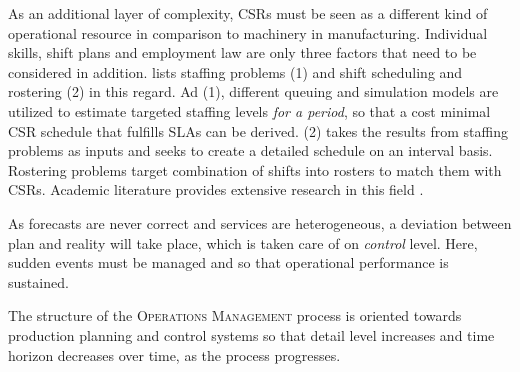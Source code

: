 	As an additional layer of complexity, \acrshort{CSR}s must be seen as a different kind of operational resource in comparison to machinery in manufacturing. Individual skills, shift plans and employment law are only three factors that need to be considered in addition. \cite{Aksin_2009} lists staffing problems (1) and shift scheduling and rostering (2) in this regard. Ad (1), different queuing and simulation models are utilized to estimate targeted staffing levels \textit{for a period}, so that a cost minimal \acrshort{CSR} schedule that fulfills \acrshort{SLA}s can be derived. 
	(2) takes the results from staffing problems as inputs and seeks to create a detailed schedule on an interval basis. Rostering problems target combination of shifts into rosters to match them with \acrshort{CSR}s. Academic literature provides extensive research in this field \citep{Gans_2003, Ernst_2004}. 
	
	As forecasts are never correct and services are heterogeneous, a deviation between plan and reality will take place, which is taken care of on \textit{control} level. Here, sudden events must be managed and so that operational performance is sustained. 
	
	The structure of the \textsc{Operations Management} process is oriented towards production planning and control systems \citep{9780130176158} so that detail level increases and time horizon decreases over time, \viz as the process progresses. 
	
